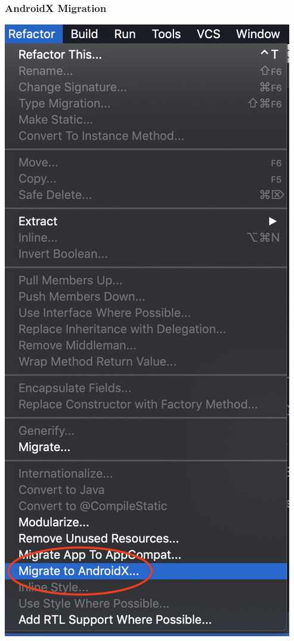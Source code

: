 \documentclass[10pt]{beamer}
\begin{document}
\begin{frame}
    \frametitle{AndroidX Migration}
    \center\includegraphics[scale=0.32]{androidx_step1}
\end{frame}
\end{document}
